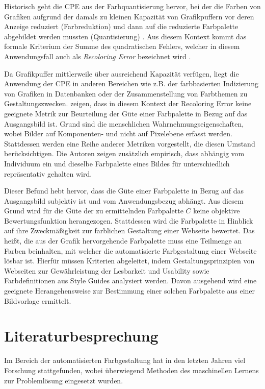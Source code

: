 \documentclass[10pt,a4paper,bibliography=totoc,twocolumn]{scrartcl}
\begin{document}
Historisch geht die CPE aus der Farbquantisierung hervor, bei der die Farben von Grafiken aufgrund der damals zu kleinen Kapazität von Grafikpuffern vor deren Anzeige reduziert (Farbreduktion) und dann auf die reduzierte Farbpalette abgebildet werden mussten (Quantisierung) \citep{variance}. Aus diesem Kontext kommt das formale Kriterium der Summe des quadratischen Fehlers, welcher in diesem Anwendungsfall auch als \emph{Recoloring Error} bezeichnet wird \citep{colorthemes}.

Da Grafikpuffer mittlerweile über ausreichend Kapazität verfügen, liegt die Anwendung der CPE in anderen Bereichen wie z.B. der farbbasierten Indizierung von Grafiken in Datenbanken oder der Zusammenstellung von Farbthemen zu Gestaltungszwecken. \citet{colorthemes} zeigen, dass in diesem Kontext der Recoloring Error keine geeignete Metrik zur Beurteilung der Güte einer Farbpalette in Bezug auf das Ausgangsbild ist. Grund sind die menschlichen Wahrnehmungseigenschaften, wobei Bilder auf Komponenten- und nicht auf Pixelebene erfasst werden. Stattdessen werden eine Reihe anderer Metriken vorgestellt, die diesen Umstand berücksichtigen. Die Autoren zeigen zusätzlich empirisch, dass abhängig vom Individuum ein und dieselbe Farbpalette eines Bildes für unterschiedlich repräsentativ gehalten wird. 

Dieser Befund hebt hervor, dass die Güte einer Farbpalette in Bezug auf das Ausgangsbild subjektiv ist und vom Anwendungsbezug abhängt. Aus diesem Grund wird für die Güte der zu ermittelnden Farbpalette $C$ keine objektive Bewertungsfunktion herangezogen. Stattdessen wird die Farbpalette in Hinblick auf ihre Zweckmäßigkeit zur farblichen Gestaltung einer Webseite bewertet. Das heißt, die aus der Grafik hervorgehende Farbpalette muss eine Teilmenge an Farben beinhalten, mit welcher die automatisierte Farbgestaltung einer Webseite lösbar ist. Hierfür müssen Kriterien abgeleitet, indem Gestaltungsprinzipien von Webseiten zur Gewährleistung der Lesbarkeit und Usability sowie Farbdefinitionen aus Style Guides analysiert werden. Davon ausgehend wird eine geeignete Herangehensweise zur Bestimmung einer solchen Farbpalette aus einer Bildvorlage ermittelt.

\section{Literaturbesprechung}

Im Bereich der automatisierten Farbgestaltung hat in den letzten Jahren viel Forschung stattgefunden, wobei überwiegend Methoden des maschinellen Lernens zur Problemlösung eingesetzt wurden.
\end{document}
